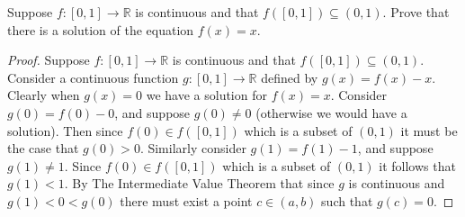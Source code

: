 \documentclass[12pt]{article}
\makeatletter
\theoremstyle{homework}
\newenvironment{exercise}[1]
{\def\@currentlabel{#1}\exercisecore}
{\endexercisecore}
\newcommand{\Reals}{\ensuremath{\mathbb R}}
\makeatother
\begin{document}
\begin{exercise}{7} Suppose $f: [0,1] \to \Reals$ is continuous and that $f([0,1]) \subseteq (0,1)$. Prove that there is a solution of the equation $f(x) = x$. 
  
\begin{proof}
  Suppose $f: [0,1] \to \Reals$ is continuous and that $f([0,1]) \subseteq (0,1)$. Consider a continuous function $g:[0,1] \to \Reals$
  defined by $g(x) = f(x) - x$. Clearly when $g(x) = 0$ we have a solution for $f(x) = x$. Consider $g(0) = f(0) - 0$, and suppose $g(0) \neq 0$ (otherwise we would have a solution). Then since $f(0) \in f([0,1])$ which is a 
  subset of $(0,1)$ it must be the case that $g(0) > 0$. Similarly consider $g(1) = f(1) - 1$, and suppose $g(1) \neq 1$. Since $f(0) \in f([0,1])$ which is a 
  subset of $(0,1)$ it follows that $g(1) < 1$. By The Intermediate Value Theorem that since $g$ is continuous and $g(1)<0<g(0)$ there must exist a point $c \in (a,b)$ such that $g(c) = 0$.
  
\end{proof}
\end{exercise}
\vspace{.5in}
\end{document}
